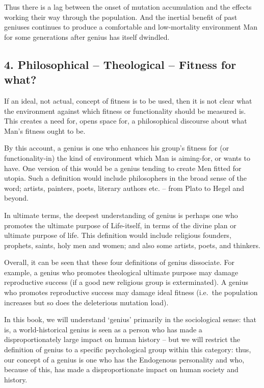 \documentclass[
]{book}
\begin{document}
Thus there is a lag between the onset of mutation accumulation and the effects working their way through the population. And the inertial benefit of past geniuses continues to produce a comfortable and low-mortality environment Man for some generations after genius has itself dwindled.

\hypertarget{philosophical-theological-fitness-for-what}{%
\subsection*{4. Philosophical -- Theological -- Fitness for what?}\label{philosophical-theological-fitness-for-what}}

If an ideal, not actual, concept of fitness is to be used, then it is not clear what the environment against which fitness or functionality should be measured is. This creates a need for, opens space for, a philosophical discourse about what Man's fitness ought to be.

By this account, a genius is one who enhances his group's fitness for (or functionality-in) the kind of environment which Man is aiming-for, or wants to have. One version of this would be a genius tending to create Men fitted for utopia. Such a definition would include philosophers in the broad sense of the word; artists, painters, poets, literary authors etc. -- from Plato to Hegel and beyond.

In ultimate terms, the deepest understanding of genius is perhaps one who promotes the ultimate purpose of Life-itself, in terms of the divine plan or ultimate purpose of life. This definition would include religious founders, prophets, saints, holy men and women; and also some artists, poets, and thinkers.

Overall, it can be seen that these four definitions of genius dissociate. For example, a genius who promotes theological ultimate purpose may damage reproductive success (if a good new religious group is exterminated). A genius who promotes reproductive success may damage ideal fitness (i.e.~the population increases but so does the deleterious mutation load).

In this book, we will understand `genius' primarily in the sociological sense: that is, a world-historical genius is seen as a person who has made a disproportionately large impact on human history -- but we will restrict the definition of genius to a specific psychological group within this category: thus, our concept of a genius is one who has the Endogenous personality and who, because of this, has made a disproportionate impact on human society and history.
\end{document}
